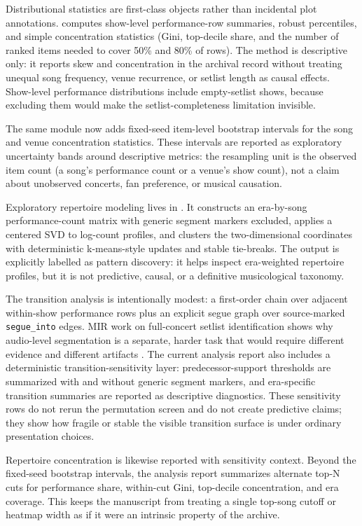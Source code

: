 \documentclass[
]{article}
\begin{document}
Distributional statistics are first-class objects rather than incidental
plot annotations.  computes
show-level performance-row summaries, robust percentiles, and simple
concentration statistics (Gini, top-decile share, and the number of
ranked items needed to cover 50\% and 80\% of rows). The method is
descriptive only: it reports skew and concentration in the archival
record without treating unequal song frequency, venue recurrence, or
setlist length as causal effects. Show-level performance distributions
include empty-setlist shows, because excluding them would make the
setlist-completeness limitation invisible.

The same module now adds fixed-seed item-level bootstrap intervals for
the song and venue concentration statistics. These intervals are
reported as exploratory uncertainty bands around descriptive metrics:
the resampling unit is the observed item count (a song's performance
count or a venue's show count), not a claim about unobserved concerts,
fan preference, or musical causation.

Exploratory repertoire modeling lives in
. It constructs an era-by-song
performance-count matrix with generic segment markers excluded, applies
a centered SVD to log-count profiles, and clusters the two-dimensional
coordinates with deterministic k-means-style updates and stable
tie-breaks. The output is explicitly labelled as pattern discovery: it
helps inspect era-weighted repertoire profiles, but it is not
predictive, causal, or a definitive musicological taxonomy.

The transition analysis is intentionally modest: a first-order chain
over adjacent within-show performance rows plus an explicit segue graph
over source-marked \texttt{segue\_into} edges. MIR work on full-concert
setlist identification shows why audio-level segmentation is a separate,
harder task that would require different evidence and different
artifacts \citep{wang_setlist_segmentation}. The current analysis report
also includes a deterministic transition-sensitivity layer:
predecessor-support thresholds are summarized with and without generic
segment markers, and era-specific transition summaries are reported as
descriptive diagnostics. These sensitivity rows do not rerun the
permutation screen and do not create predictive claims; they show how
fragile or stable the visible transition surface is under ordinary
presentation choices.

Repertoire concentration is likewise reported with sensitivity context.
Beyond the fixed-seed bootstrap intervals, the analysis report
summarizes alternate top-N cuts for performance share, within-cut Gini,
top-decile concentration, and era coverage. This keeps the manuscript
from treating a single top-song cutoff or heatmap width as if it were an
intrinsic property of the archive.
\end{document}
